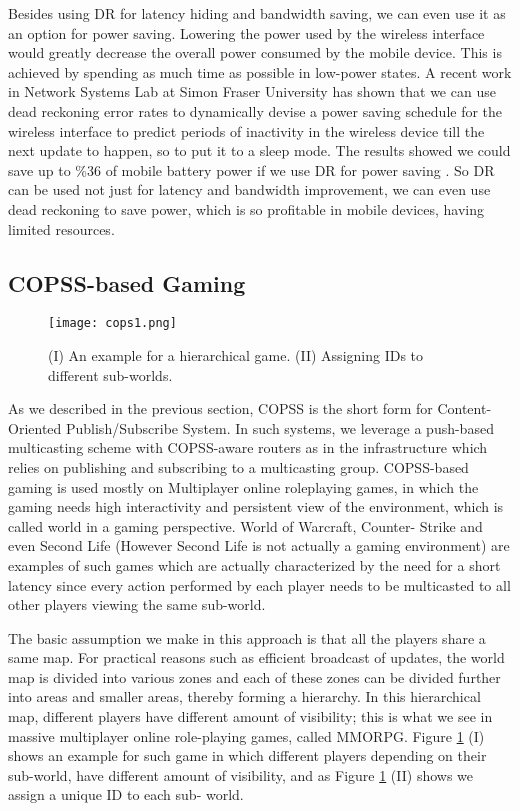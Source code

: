 \documentclass[conference]{IEEEtran}
\begin{document}
Besides using DR for latency hiding and bandwidth saving, we can even use it as an option for power saving. Lowering the power used by the wireless interface would greatly decrease the overall power consumed by the mobile device. This is achieved by spending as much time as possible  in  low-power  states.  A  recent  work in Network Systems Lab at Simon  Fraser  University has shown that we can use dead reckoning error rates to dynamically devise a power saving schedule for the wireless interface to predict periods of inactivity in the wireless device till the next  update  to  happen,  so  to put it to a sleep mode. The results showed we could save up to \%36 of mobile battery power if we use DR for power saving \cite{r27}. So DR can be used not just for latency and bandwidth improvement, we can even use dead reckoning to save power, which is so profitable in mobile devices, having limited resources.

\subsection{COPSS-based Gaming}

\begin{figure}[!t]
\caption{(I) An example for a hierarchical game. (II) Assigning IDs to different sub-worlds.}
\centering
\texttt{[image: cops1.png]}
\label{cops}
\end{figure}

As we described in the previous section, COPSS is the short form for Content-Oriented Publish/Subscribe System. In such systems, we leverage a push-based multicasting scheme with COPSS-aware routers as in the infrastructure which relies on publishing and subscribing to a multicasting group. COPSS-based gaming is used mostly on Multiplayer online roleplaying games, in which the gaming needs high interactivity and persistent view of the environment, which is called world in a gaming perspective. World of Warcraft, Counter- Strike and even Second Life (However Second Life is not actually a gaming environment) are examples of such games which are actually characterized by the need for a short latency since every action performed by each player needs to be multicasted to all other players viewing the same sub-world.

The basic assumption we make in this approach is that all the players share a same map. For practical reasons such as efficient broadcast of updates, the world map is divided into various zones and each of these zones can be divided further into areas and smaller areas, thereby forming a hierarchy. In this hierarchical map, different players have different amount of visibility; this is what we see in massive multiplayer online role-playing games, called MMORPG. Figure \ref{cops} (I) shows an example  for such game in which different players depending on their sub-world, have different amount of visibility, and as Figure \ref{cops} (II) shows we assign a unique ID to each sub- world.
\end{document}
